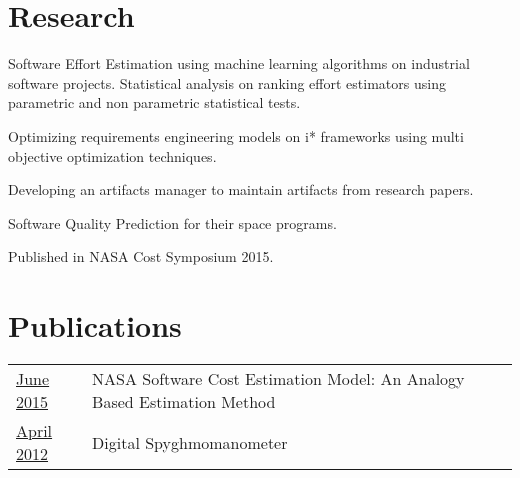 \documentclass[]{bigfatnoob-resume}
\begin{document}
\begin{minipage}[t]{0.66\textwidth}

\section{Research}
\descript{}
\begin{tightemize}
\item Software Effort Estimation using machine learning algorithms on industrial software projects. Statistical analysis on ranking effort estimators using parametric and non parametric statistical tests.
\item Optimizing requirements engineering models on i* frameworks using multi objective optimization techniques.
\item Developing an artifacts manager to maintain artifacts from research papers.
\end{tightemize}
\sectionsep

\descript{}
\begin{tightemize}
\item Software Quality Prediction for their space programs.
\item Published in NASA Cost Symposium 2015.
\end{tightemize}
\sectionsep


\section{Publications} 
\begin{tabular}{p{2cm}p{9.2cm}}
	\href{https://www.nasa.gov/sites/default/files/files/27_NASA_SC_SW_Cost_Model_final.pdf}{June 2015}  & NASA Software Cost Estimation Model: An Analogy Based Estimation Method\\
	\href{http://georgevmathew.com/other-files/Digital_Sphygmomanometer.pdf}{April 2012} & Digital Spyghmomanometer\\
\end{tabular}
\sectionsep

\end{minipage} 
\end{document}
